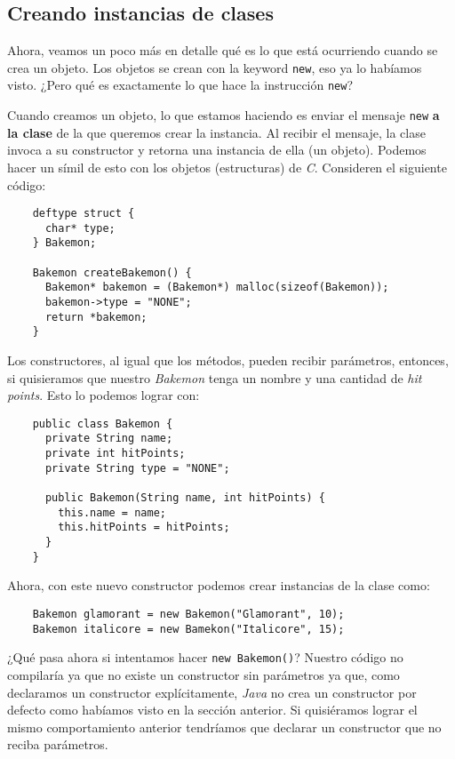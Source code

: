 \subsection{Creando instancias de clases}
  Ahora, veamos un poco más en detalle qué es lo que está ocurriendo cuando se crea un objeto.
  Los objetos se crean con la keyword \texttt{new}, eso ya lo habíamos visto. 
  ¿Pero qué es exactamente lo que hace la instrucción \texttt{new}?

  Cuando creamos un objeto, lo que estamos haciendo es enviar el mensaje \texttt{new} 
  \textbf{a la clase} de la que queremos crear la instancia.
  Al recibir el mensaje, la clase invoca a su constructor y retorna una instancia de ella (un 
  objeto).
  Podemos hacer un símil de esto con los objetos (estructuras) de \textit{C}.
  Consideren el siguiente código:

  \begin{verbatim}
    deftype struct {
      char* type;
    } Bakemon;

    Bakemon createBakemon() {
      Bakemon* bakemon = (Bakemon*) malloc(sizeof(Bakemon));
      bakemon->type = "NONE";
      return *bakemon;
    }
  \end{verbatim}

  Los constructores, al igual que los métodos, pueden recibir parámetros, entonces, si quisieramos 
  que nuestro \textit{Bakemon} tenga un nombre y una cantidad de \textit{hit points}. 
  Esto lo podemos lograr con:

  \begin{verbatim}
    public class Bakemon {
      private String name;
      private int hitPoints;
      private String type = "NONE";

      public Bakemon(String name, int hitPoints) {
        this.name = name;
        this.hitPoints = hitPoints;
      }
    }
  \end{verbatim}

  Ahora, con este nuevo constructor podemos crear instancias de la clase como:
  \begin{verbatim}
    Bakemon glamorant = new Bakemon("Glamorant", 10);
    Bakemon italicore = new Bamekon("Italicore", 15);
  \end{verbatim}

  ¿Qué pasa ahora si intentamos hacer \texttt{new Bakemon()}?
  Nuestro código no compilaría ya que no existe un constructor sin parámetros ya que, como 
  declaramos un constructor explícitamente, \textit{Java} no crea un constructor por defecto como
  habíamos visto en la sección anterior.
  Si quisiéramos lograr el mismo comportamiento anterior tendríamos que declarar un constructor que
  no reciba parámetros.

